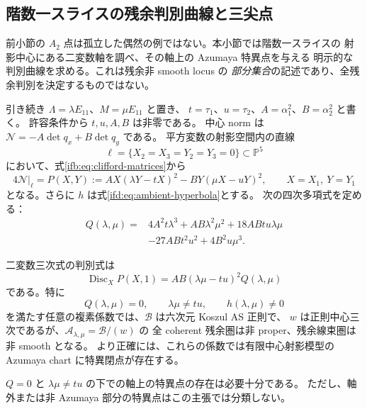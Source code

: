 \subsection{階数一スライスの残余判別曲線と三尖点}
\label{ifq:subsec:caustic}

前小節の $A_2$ 点は孤立した偶然の例ではない。本小節では階数一スライスの
射影中心にある二変数軸を調べ、その軸上の Azumaya 特異点を与える
明示的な判別曲線を求める。これは残余非 smooth locus の
\emph{部分集合}の記述であり、全残余判別を決定するものではない。

引き続き $\Lambda=\lambda E_{11}$、$M=\mu E_{11}$ と置き、
$t=\tau_1$、$u=\tau_2$、$A=\alpha_1^2$、$B=\alpha_2^2$ と書く。
許容条件から $t,u,A,B$ は非零である。
中心 norm は $\mathcal N=-A\det q_x+B\det q_y$ である。
平方変数の射影空間内の直線
\[
 \ell=\{X_2=X_3=Y_2=Y_3=0\}\subset\mathbb P^5
\]
において、式\eqref{ifb:eq:clifford-matrices}から
\begin{equation}\label{ifq:eq:binary}
 4\mathcal N|_\ell=P(X,Y)
 :=AX(\lambda Y-tX)^2-BY(\mu X-uY)^2,\qquad X=X_1,\ Y=Y_1
\end{equation}
となる。さらに $h$ は式\eqref{ifd:eq:ambient-hyperbola}とする。
次の四次多項式を定める：
\begin{equation}\label{ifq:eq:quartic}
 \begin{split}
 Q(\lambda,\mu)={}&4A^2t\lambda^3+AB\lambda^2\mu^2
      +18ABtu\lambda\mu\\
      &-27ABt^2u^2+4B^2u\mu^3.
 \end{split}
\end{equation}

\begin{theorem}
\label{ifq:thm:axis-discriminant}
二変数三次式の判別式は
\begin{equation}\label{ifq:eq:disc-factor}
 \operatorname{Disc}_X P(X,1)
    =AB(\lambda\mu-tu)^2Q(\lambda,\mu)
\end{equation}
である。特に
\begin{equation}\label{ifq:eq:bad-open}
           Q(\lambda,\mu)=0,\qquad
           \lambda\mu\ne tu,\qquad h(\lambda,\mu)\ne0
\end{equation}
を満たす任意の複素係数では、$\mathcal B$ は六次元 Koszul AS 正則で、
$w$ は正則中心三次であるが、$\mathcal A_{\lambda,\mu}=\mathcal B/(w)$ の
全 coherent 残余圏は非 proper、残余線束圏は非 smooth となる。
より正確には、これらの係数では有限中心射影模型の
Azumaya chart に特異閉点が存在する。

$Q=0$ と $\lambda\mu\ne tu$ の下での軸上の特異点の存在は必要十分である。
ただし、軸外または非 Azumaya 部分の特異点はこの主張では分類しない。
\end{theorem}

